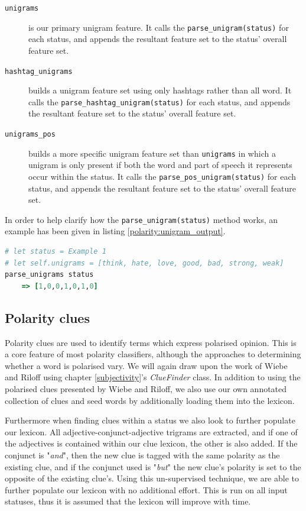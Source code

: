\begin{description}
	\item [\texttt{unigrams}] is our primary unigram feature. It calls the \texttt{parse\-\_unigram\-(status)} for each status, and appends the resultant feature set to the status' overall feature set.
	\item [\texttt{hashtag\_unigrams}] builds a unigram feature set using only hashtags rather than all word. It calls the \texttt{parse\-\_hashtag\-\_unigram\-(status)} for each status, and appends the resultant feature set to the status' overall feature set.
	\item [\texttt{unigrams\_pos}] builds a more specific unigram feature set than \texttt{unigrams} in which a unigram is only present if both the word and part of speech it represents occur within the status. It calls the \texttt{parse\-\_pos\-\_unigram\-(status)} for each status, and appends the resultant feature set to the status' overall feature set.
\end{description}

In order to help clarify how the \texttt{parse\-\_unigram\-(status)} method works, an example has been given in listing \ref{polarity:unigram_output}.

\begin{lstlisting}[language=Ruby, caption={Unigram parsing for \emph{Example 1} using a small unigram set}, label=polarity:unigram_output]
# let status = Example 1
# let self.unigrams = [think, hate, love, good, bad, strong, weak]
parse_unigrams status
	=> [1,0,0,1,0,1,0]
\end{lstlisting}

\subsection{Polarity clues}
\label{polarity:clues}

Polarity clues are used to identify terms which express polarised opinion. This is a core feature of most polarity classifiers, although the approaches to determining whether a word is polarised vary. We will again draw upon the work of Wiebe and Riloff \cite{Wiebe:2003wa} using chapter \ref{subjectivity}'s \emph{ClueFinder} class. In addition to using the polarised clues presented by Wiebe and Riloff, we also use our own annotated collection of clues and seed words by additionally loading them into the lexicon.

Furthermore when finding clues within a status we also look to further populate our lexicon. All adjective-conjunct-adjective trigrams are extracted, and if one of the adjectives is contained within our clue lexicon, the other is also added. If the conjunct is "\emph{and}", then the new clue is tagged with the same polarity as the existing clue, and if the conjunct used is "\emph{but}" the new clue's polarity is set to the opposite of the existing clue's. Using this un-supervised technique, we are able to further populate our lexicon with no additional effort. This is run on all input statuses, thus it is assumed that the lexicon will improve with time. 

